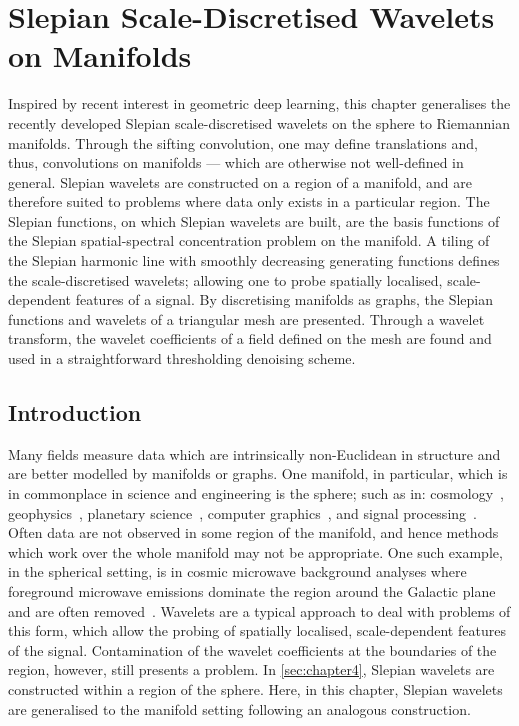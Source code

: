 \chapter{Slepian Scale-Discretised Wavelets on Manifolds}\label{sec:chapter5}

Inspired by recent interest in geometric deep learning, this chapter generalises the recently developed Slepian scale-discretised wavelets on the sphere to Riemannian manifolds.
Through the sifting convolution, one may define translations and, thus, convolutions on manifolds --- which are otherwise not well-defined in general.
Slepian wavelets are constructed on a region of a manifold, and are therefore suited to problems where data only exists in a particular region.
The Slepian functions, on which Slepian wavelets are built, are the basis functions of the Slepian spatial-spectral concentration problem on the manifold.
A tiling of the Slepian harmonic line with smoothly decreasing generating functions defines the scale-discretised wavelets; allowing one to probe spatially localised, scale-dependent features of a signal.
By discretising manifolds as graphs, the Slepian functions and wavelets of a triangular mesh are presented.
Through a wavelet transform, the wavelet coefficients of a field defined on the mesh are found and used in a straightforward thresholding denoising scheme.

\section{Introduction}

Many fields measure data which are intrinsically non-Euclidean in structure and are better modelled by manifolds or graphs.
One manifold, in particular, which is in commonplace in science and engineering is the sphere; such as in: cosmology~\cite{Bennett1996}, geophysics~\cite{Simons2006}, planetary science~\cite{Turcotte1981}, computer graphics~\cite{Ramamoorthi2004}, and signal processing~\cite{Roddy2021a}.
Often data are not observed in some region of the manifold, and hence methods which work over the whole manifold may not be appropriate.
One such example, in the spherical setting, is in cosmic microwave background analyses where foreground microwave emissions dominate the region around the  Galactic plane and are often removed~\cite{Mortlock2002}.
Wavelets are a typical approach to deal with problems of this form, which allow the probing of spatially localised, scale-dependent features of the signal.
Contamination of the wavelet coefficients at the boundaries of the region, however, still presents a problem.
In \cref{sec:chapter4}, Slepian wavelets are constructed within a region of the sphere.
Here, in this chapter, Slepian wavelets are generalised to the manifold setting following an analogous construction.

